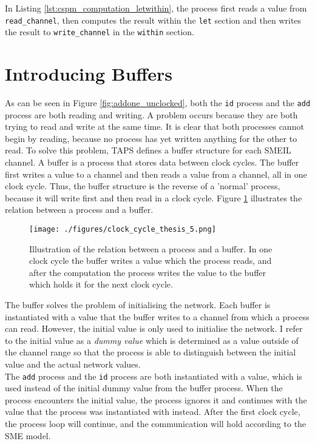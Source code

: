 In Listing \ref{lst:cspm_computation_letwithin}, the process first reads a value from \texttt{read\_channel}, then computes the result within the \texttt{let} section and then writes the result to \texttt{write\_channel} in the \texttt{within} section.
\section{Introducing Buffers}
As can be seen in Figure \ref{fig:addone_unclocked}, both the \texttt{id} process and the \texttt{add} process are both reading and writing. A problem occurs because they are both trying to read and write at the same time. It is clear that both processes cannot begin by reading, because no process has yet written anything for the other to read.
To solve this problem, TAPS defines a buffer structure for each SMEIL channel. A buffer is a process that stores data between clock cycles. The buffer first writes a value to a channel and then reads a value from a channel, all in one clock cycle. Thus, the buffer structure is the reverse of a 'normal' process, because it will write first and then read in a clock cycle. Figure \ref{fig:clock_cycle} illustrates the relation between a process and a buffer.\\

\begin{figure}
\centering
\texttt{[image: ./figures/clock\_cycle\_thesis\_5.png]}
\caption{Illustration of the relation between a process and a buffer. In one clock cycle the buffer writes a value which the process reads, and after the computation the process writes the value to the buffer which holds it for the next clock cycle.}
\label{fig:clock_cycle}
\end{figure}


The buffer solves the problem of initialising the network. Each buffer is instantiated with a value that the buffer writes to a channel from which a process can read. However, the initial value is only used to initialise the network. I refer to the initial value as a \textit{dummy value} which is determined as a value outside of the channel range so that the process is able to distinguish between the initial value and the actual network values. \\

The \texttt{add} process and the \texttt{id} process are both instantiated with a value, which is used instead of the initial dummy value from the buffer process. When the process encounters the initial value, the process ignores it and continues with the value that the process was instantiated with instead. After the first clock cycle, the process loop will continue, and the communication will hold according to the SME model.\\

